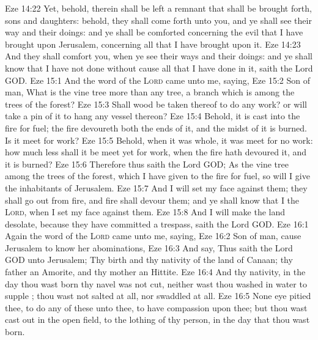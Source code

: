 \vs Eze 14:22 Yet, behold, therein shall be left a remnant that shall be brought forth,  sons and daughters: behold, they shall come forth unto you, and ye shall see their way and their doings: and ye shall be comforted concerning the evil that I have brought upon Jerusalem,  concerning all that I have brought upon it.
\vs Eze 14:23 And they shall comfort you, when ye see their ways and their doings: and ye shall know that I have not done without cause all that I have done in it, saith the Lord GOD.
\vs Eze 15:1 And the word of the \textsc{Lord} came unto me, saying,
\vs Eze 15:2 Son of man, What is the vine tree more than any tree,  a branch which is among the trees of the forest?
\vs Eze 15:3 Shall wood be taken thereof to do any work? or will  take a pin of it to hang any vessel thereon?
\vs Eze 15:4 Behold, it is cast into the fire for fuel; the fire devoureth both the ends of it, and the midst of it is burned. Is it meet for  work?
\vs Eze 15:5 Behold, when it was whole, it was meet for no work: how much less shall it be meet yet for  work, when the fire hath devoured it, and it is burned?
\vs Eze 15:6 Therefore thus saith the Lord GOD; As the vine tree among the trees of the forest, which I have given to the fire for fuel, so will I give the inhabitants of Jerusalem.
\vs Eze 15:7 And I will set my face against them; they shall go out from  fire, and  fire shall devour them; and ye shall know that I  the \textsc{Lord}, when I set my face against them.
\vs Eze 15:8 And I will make the land desolate, because they have committed a trespass, saith the Lord GOD.
\vs Eze 16:1 Again the word of the \textsc{Lord} came unto me, saying,
\vs Eze 16:2 Son of man, cause Jerusalem to know her abominations,
\vs Eze 16:3 And say, Thus saith the Lord GOD unto Jerusalem; Thy birth and thy nativity  of the land of Canaan; thy father  an Amorite, and thy mother an Hittite.
\vs Eze 16:4 And  thy nativity, in the day thou wast born thy navel was not cut, neither wast thou washed in water to supple ; thou wast not salted at all, nor swaddled at all.
\vs Eze 16:5 None eye pitied thee, to do any of these unto thee, to have compassion upon thee; but thou wast cast out in the open field, to the lothing of thy person, in the day that thou wast born.
